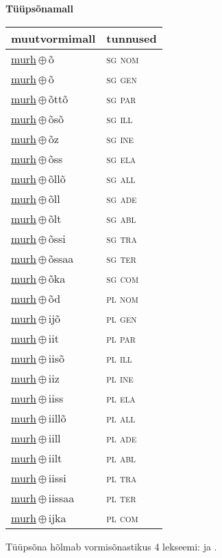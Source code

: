 

\vspace{3.5em}
\noindent \begin{minipage}{\textwidth}
\noindent \textbf{Tüüpsõnamall \,}\\

\begin{sideways}
\begin{tabular}{l l}
muutvormimall & tunnused \\
\hline
\underline{murh}\,$\oplus$\,õ & \textsc{ sg nom } \\
\underline{murh}\,$\oplus$\,õ & \textsc{ sg gen } \\
\underline{murh}\,$\oplus$\,õttõ & \textsc{ sg par } \\
\underline{murh}\,$\oplus$\,õsõ & \textsc{ sg ill } \\
\underline{murh}\,$\oplus$\,õz & \textsc{ sg ine } \\
\underline{murh}\,$\oplus$\,õss & \textsc{ sg ela } \\
\underline{murh}\,$\oplus$\,õllõ & \textsc{ sg all } \\
\underline{murh}\,$\oplus$\,õll & \textsc{ sg ade } \\
\underline{murh}\,$\oplus$\,õlt & \textsc{ sg abl } \\
\underline{murh}\,$\oplus$\,õssi & \textsc{ sg tra } \\
\underline{murh}\,$\oplus$\,õssaa & \textsc{ sg ter } \\
\underline{murh}\,$\oplus$\,õka & \textsc{ sg com } \\
\underline{murh}\,$\oplus$\,õd & \textsc{ pl nom } \\
\underline{murh}\,$\oplus$\,ijõ & \textsc{ pl gen } \\
\underline{murh}\,$\oplus$\,iit & \textsc{ pl par } \\
\underline{murh}\,$\oplus$\,iisõ & \textsc{ pl ill } \\
\underline{murh}\,$\oplus$\,iiz & \textsc{ pl ine } \\
\underline{murh}\,$\oplus$\,iiss & \textsc{ pl ela } \\
\underline{murh}\,$\oplus$\,iillõ & \textsc{ pl all } \\
\underline{murh}\,$\oplus$\,iill & \textsc{ pl ade } \\
\underline{murh}\,$\oplus$\,iilt & \textsc{ pl abl } \\
\underline{murh}\,$\oplus$\,iissi & \textsc{ pl tra } \\
\underline{murh}\,$\oplus$\,iissaa & \textsc{ pl ter } \\
\underline{murh}\,$\oplus$\,ijka & \textsc{ pl com } \\
\end{tabular}
\end{sideways}
\label{tab:tüüpsõnamall-murhõ}

\end{minipage}

 
\vspace{1em}
\noindent Tüüpsõna hõlmab vormisõnastikus 4 lekseemi:  ja .
